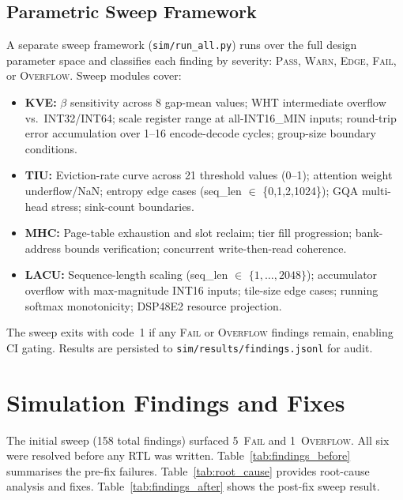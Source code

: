 \documentclass[conference]{IEEEtran}
\newcommand{\kve}{\textsc{KVE}}
\newcommand{\tiu}{\textsc{TIU}}
\newcommand{\mhc}{\textsc{MHC}}
\newcommand{\lacu}{\textsc{LACU}}
\begin{document}
\subsection{Parametric Sweep Framework}

A separate sweep framework (\texttt{sim/run\_all.py}) runs over the
full design parameter space and classifies each finding by severity:
\textsc{Pass}, \textsc{Warn}, \textsc{Edge}, \textsc{Fail}, or
\textsc{Overflow}. Sweep modules cover:

\begin{itemize}
  \item \textbf{\kve:} $\beta$ sensitivity across 8 gap-mean values;
        WHT intermediate overflow vs.\ INT32/INT64; scale register
        range at all-INT16\_MIN inputs; round-trip error accumulation
        over 1--16 encode-decode cycles; group-size boundary conditions.
  \item \textbf{\tiu:} Eviction-rate curve across 21 threshold values
        (0--1); attention weight underflow/NaN; entropy edge cases
        (seq\_len $\in$ \{0,1,2,1024\}); GQA multi-head stress;
        sink-count boundaries.
  \item \textbf{\mhc:} Page-table exhaustion and slot reclaim; tier
        fill progression; bank-address bounds verification; concurrent
        write-then-read coherence.
  \item \textbf{\lacu:} Sequence-length scaling (seq\_len $\in$
        $\{1,\ldots,2048\}$); accumulator overflow with
        max-magnitude INT16 inputs; tile-size edge cases; running
        softmax monotonicity; DSP48E2 resource projection.
\end{itemize}

The sweep exits with code~1 if any \textsc{Fail} or
\textsc{Overflow} findings remain, enabling CI gating. Results are
persisted to \texttt{sim/results/findings.jsonl} for audit.

\section{Simulation Findings and Fixes}
\label{sec:findings}

The initial sweep (158 total findings) surfaced 5~\textsc{Fail} and
1~\textsc{Overflow}. All six were resolved before any RTL was written.
Table~\ref{tab:findings_before} summarises the pre-fix failures.
Table~\ref{tab:root_cause} provides root-cause analysis and fixes.
Table~\ref{tab:findings_after} shows the post-fix sweep result.
\end{document}
